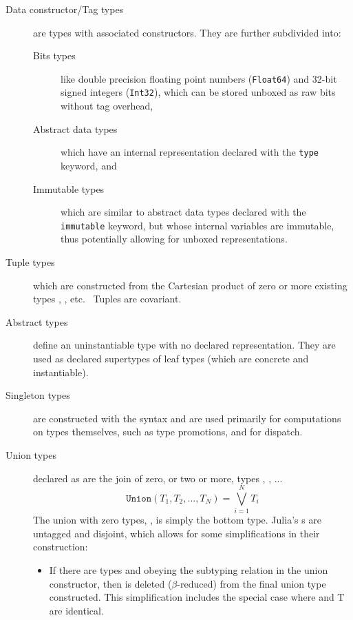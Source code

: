 \documentclass[pldi]{sigplanconf-pldi15}
\begin{document}
\begin{description}

\item[Data constructor/Tag types] are types with associated constructors. They
	are further subdivided into:
	\begin{description}
	
	\item[Bits types] like double precision floating point numbers
	(\verb|Float64|) and 32-bit signed integers (\verb|Int32|), which can
	be stored unboxed as raw bits without tag overhead,

	\item[Abstract data types] which have an internal representation
		declared with the \verb|type| keyword, and
		
	\item[Immutable types] which are similar to abstract data types
		declared with the \verb|immutable| keyword, but whose internal
		variables are immutable, thus potentially allowing for unboxed
		representations.

	\end{description}


\item[Tuple types]  which are constructed from the Cartesian
	product of zero or more existing types , ,
	etc.~\cite[Sec. 11.7]{Pierce2002} Tuples are covariant.

\item[Abstract types] define an uninstantiable type with no declared
	representation. They are used as declared supertypes of leaf types
	(which are concrete and instantiable).

\item[Singleton types] are constructed with the  syntax and
	are used  primarily for computations on types themselves, such as
	type promotions, and for dispatch.

\item[Union types] declared as  are the join of zero,
	or two or more, types , , ...~\cite[Sec.
	15.7]{Pierce2002}
	\begin{equation}
		\texttt{Union}(T_1, T_2, ..., T_N) = \bigvee_{i=1}^N T_i 
	\end{equation}
	The union with zero types, , is simply the bottom type.
	Julia's s are untagged and disjoint, which allows for some
	simplifications in their construction:
	\begin{itemize}
		\item If there are types  and  obeying the
			subtyping relation  in the union
			constructor, then  is deleted ($\beta$-reduced)
			from the final union type constructed. This
			simplification includes the special case where 
			and \code T are identical.


\end{itemize}
\end{description}
\end{document}
